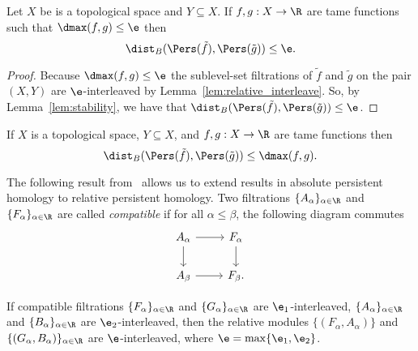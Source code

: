 \begin{lemma}\label{lem:relative_stability}
    Let $X$ be is a topological space and $Y\subseteq X$.
    If $f,g:X\to\R$ are tame functions such that $\dmax(f, g)\leq\e$ then
    \[ \dist_B(\Pers(\tilde{f}), \Pers(\tilde{g}))\leq\e.\]
\end{lemma}
\begin{proof}
    Because $\dmax(f, g)\leq\e$ the sublevel-set filtrations of $\tilde{f}$ and $\tilde{g}$ on the pair $(X, Y)$ are $\e$-interleaved by Lemma~\ref{lem:relative_interleave}.
    So, by Lemma~\ref{lem:stability}, we have that $\dist_B(\Pers(\tilde{f}), \Pers(\tilde{g}))\leq\e$.
\end{proof}

\begin{corollary}\label{cor:relative_stability}
    If $X$ is a topological space, $Y\subseteq X$, and $f,g: X\to\R$ are tame functions then
    \[ \dist_B(\Pers(\tilde{f}), \Pers(\tilde{g}))\leq \dmax(f, g).\]
\end{corollary}

The following result from~\cite{skraba14approximating} allows us to extend results in absolute persistent homology to relative persistent homology.
Two filtrations $\{A_\alpha\}_{\alpha\in\R}$ and $\{F_\alpha\}_{\alpha\in\R}$ are called \emph{compatible} if for all $\alpha\leq\beta$, the following diagram commutes
\[\begin{tikzcd}
    A_\alpha \arrow[r] \arrow[d] & F_\alpha \arrow[d] \\
    A_\beta \arrow[r] & F_\beta.
\end{tikzcd}\]

\begin{theorem}\label{thm:compatible}
    If compatible filtrations $\{F_\alpha\}_{\alpha\in\R}$ and $\{G_\alpha\}_{\alpha\in\R}$ are $\e_1$-interleaved,
    $\{A_\alpha\}_{\alpha\in\R}$ and $\{B_\alpha\}_{\alpha\in\R}$ are $\e_2$-interleaved, then the relative modules $\{(F_\alpha, A_\alpha)\}$ and $\{(G_\alpha, B_\alpha)\}_{\alpha\in\R}$ are $\e$-interleaved, where $\e = \max\{\e_1,\e_2\}$.
\end{theorem}
